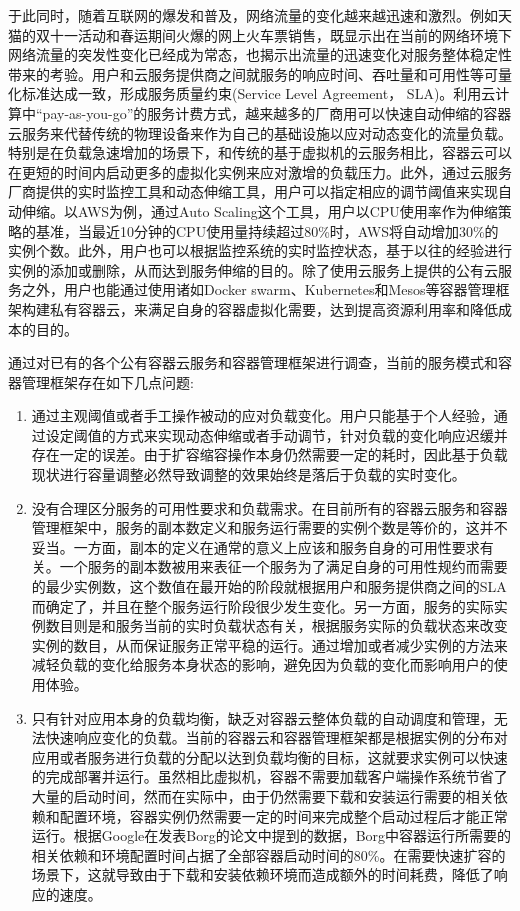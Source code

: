 于此同时，随着互联网的爆发和普及，网络流量的变化越来越迅速和激烈。例如天猫的双十一活动和春运期间火爆的网上火车票销售，既显示出在当前的网络环境下网络流量的突发性变化已经成为常态，也揭示出流量的迅速变化对服务整体稳定性带来的考验。用户和云服务提供商之间就服务的响应时间、吞吐量和可用性等可量化标准达成一致，形成服务质量约束(Service Level Agreement， SLA)\cite{patel2009service}。利用云计算中“pay-as-you-go”的服务计费方式\cite{armbrust2010view}，越来越多的厂商用可以快速自动伸缩的容器云服务来代替传统的物理设备来作为自己的基础设施以应对动态变化的流量负载。特别是在负载急速增加的场景下，和传统的基于虚拟机的云服务相比，容器云可以在更短的时间内启动更多的虚拟化实例来应对激增的负载压力。此外，通过云服务厂商提供的实时监控工具和动态伸缩工具，用户可以指定相应的调节阈值来实现自动伸缩。以AWS为例，通过Auto Scaling这个工具，用户以CPU使用率作为伸缩策略的基准，当最近10分钟的CPU使用量持续超过80\%时，AWS将自动增加30\%的实例个数。此外，用户也可以根据监控系统的实时监控状态，基于以往的经验进行实例的添加或删除，从而达到服务伸缩的目的。除了使用云服务上提供的公有云服务之外，用户也能通过使用诸如Docker swarm、Kubernetes和Mesos等容器管理框架构建私有容器云，来满足自身的容器虚拟化需要，达到提高资源利用率和降低成本的目的。

通过对已有的各个公有容器云服务和容器管理框架进行调查，当前的服务模式和容器管理框架存在如下几点问题:
\begin{enumerate}
\item 通过主观阈值或者手工操作被动的应对负载变化。用户只能基于个人经验，通过设定阈值的方式来实现动态伸缩或者手动调节，针对负载的变化响应迟缓并存在一定的误差。由于扩容缩容操作本身仍然需要一定的耗时，因此基于负载现状进行容量调整必然导致调整的效果始终是落后于负载的实时变化。
\item 没有合理区分服务的可用性要求和负载需求。在目前所有的容器云服务和容器管理框架中，服务的副本数定义和服务运行需要的实例个数是等价的，这并不妥当。一方面，副本的定义在通常的意义上应该和服务自身的可用性要求有关。一个服务的副本数被用来表征一个服务为了满足自身的可用性规约而需要的最少实例数，这个数值在最开始的阶段就根据用户和服务提供商之间的SLA而确定了，并且在整个服务运行阶段很少发生变化\cite{beyer2016site}。另一方面，服务的实际实例数目则是和服务当前的实时负载状态有关，根据服务实际的负载状态来改变实例的数目，从而保证服务正常平稳的运行。通过增加或者减少实例的方法来减轻负载的变化给服务本身状态的影响，避免因为负载的变化而影响用户的使用体验。
\item 只有针对应用本身的负载均衡，缺乏对容器云整体负载的自动调度和管理，无法快速响应变化的负载。当前的容器云和容器管理框架都是根据实例的分布对应用或者服务进行负载的分配以达到负载均衡的目标，这就要求实例可以快速的完成部署并运行。虽然相比虚拟机，容器不需要加载客户端操作系统节省了大量的启动时间，然而在实际中，由于仍然需要下载和安装运行需要的相关依赖和配置环境，容器实例仍然需要一定的时间来完成整个启动过程后才能正常运行。根据Google在发表Borg的论文中提到的数据，Borg中容器运行所需要的相关依赖和环境配置时间占据了全部容器启动时间的80\%\cite{verma2015large}。在需要快速扩容的场景下，这就导致由于下载和安装依赖环境而造成额外的时间耗费，降低了响应的速度。
\end{enumerate}

